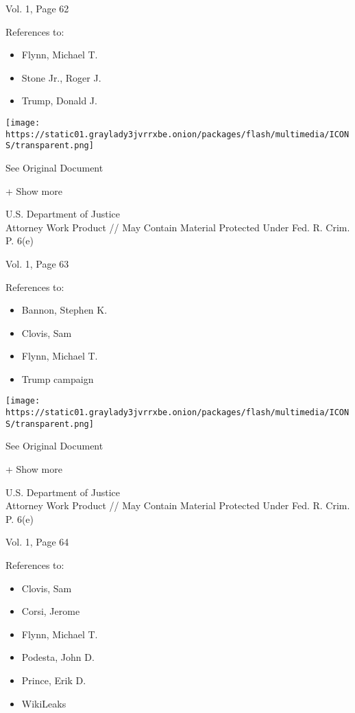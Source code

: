 Vol. 1, Page 62

References to:

\begin{itemize}
\tightlist
\item
  Flynn, Michael T.
\item
  Stone Jr., Roger J.
\item
  Trump, Donald J.
\end{itemize}

\protect\hyperlink{}{}

\texttt{[image: https://static01.graylady3jvrrxbe.onion/packages/flash/multimedia/ICONS/transparent.png]}

See Original Document

+ Show more

U.S. Department of Justice\\
Attorney Work Product // May Contain Material Protected Under Fed. R.
Crim. P. 6(e)

Vol. 1, Page 63

References to:

\begin{itemize}
\tightlist
\item
  Bannon, Stephen K.
\item
  Clovis, Sam
\item
  Flynn, Michael T.
\item
  Trump campaign
\end{itemize}

\protect\hyperlink{}{}

\texttt{[image: https://static01.graylady3jvrrxbe.onion/packages/flash/multimedia/ICONS/transparent.png]}

See Original Document

+ Show more

U.S. Department of Justice\\
Attorney Work Product // May Contain Material Protected Under Fed. R.
Crim. P. 6(e)

Vol. 1, Page 64

References to:

\begin{itemize}
\tightlist
\item
  Clovis, Sam
\item
  Corsi, Jerome
\item
  Flynn, Michael T.
\item
  Podesta, John D.
\item
  Prince, Erik D.
\item
  WikiLeaks
\end{itemize}

